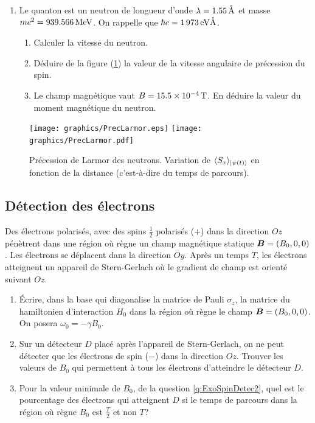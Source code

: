\begin{enumerate}
\item Le quanton est un neutron de longueur d'onde
$\lambda=1.55\operatorname{\mathring{A}}$ et masse $mc^{2}=939.566\operatorname{MeV}$.
On rappelle que $\hbar c=1\,973\operatorname{eV\mathring{A}}$.

\begin{enumerate}
\item Calculer la vitesse du neutron.

\item Déduire de la figure (\ref{fig:PrecLarmor}) la valeur de la vitesse
angulaire de précession du spin.

\item Le champ magnétique vaut $B=15.5\times10^{-4}\operatorname{T}$. En déduire
la valeur du moment magnétique du neutron.
\end{enumerate}
\end{enumerate}

\begin{figure}[ptbh]
\centering
\ifcase\msipdfoutput
	\texttt{[image: graphics/PrecLarmor.eps]}
\else
	\texttt{[image: graphics/PrecLarmor.pdf]}
\fi
\caption{Précession de Larmor des neutrons. Variation de $\langle
S_{x}\rangle _{\vert\psi(t)\rangle}$ en fonction de la
distance (c'est-à-dire du temps de parcours).}%
\label{fig:PrecLarmor}%
\end{figure}

\subsection{Détection des électrons}

Des électrons polarisés, avec des spins $\frac{1}{2}$ polarisés ($+$) dans la
direction $Oz$ pénètrent dans une région où règne un champ magnétique statique
$\boldsymbol{B}=(B_0,0,0)$. Les électrons se déplacent dans la direction $Oy$.
Après un temps $T$, les électrons atteignent un appareil de Stern-Gerlach où le
gradient de champ est orienté suivant $Oz$.

\begin{enumerate}
\item Écrire, dans la base qui diagonalise la matrice de Pauli $\sigma_z$, la
matrice du hamiltonien d'interaction $H_0$ dans la région où règne le champ
$\boldsymbol{B}=(B_0,0,0)$. On posera $\omega _0=-\gamma B_0$.

\item \label{q:ExoSpinDetec2}Sur un détecteur $D$ placé après l'appareil de
Stern-Gerlach, on ne peut détecter que les électrons de spin ($-$) dans la
direction $Oz$. Trouver les valeurs de $B_0$ qui permettent à tous les
électrons d'atteindre le détecteur $D$.

\item Pour la valeur minimale de $B_0$, de la question \ref{q:ExoSpinDetec2}, 
quel est le pourcentage des électrons qui atteignent $D$ si le temps de parcours 
dans la région où règne $B_0$ est $\frac{T}{2}$ et non $T$?
\end{enumerate}


